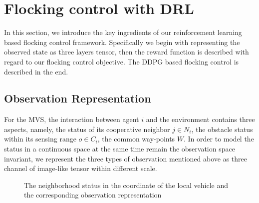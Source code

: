 \documentclass[letterpaper,10 pt,conference]{ieeeconf}
\begin{document}
\section{Flocking control with DRL}
In this section, we introduce the key ingredients of our reinforcement learning based flocking control framework. Specifically we begin with representing the observed state as three layers tensor, then the reward function is described with regard to our flocking control objective. The DDPG based flocking control is described in the end.
\subsection{Observation Representation}
For the MVS, the interaction between agent $i$ and the environment contains three aspects, namely, the status of its cooperative neighbor $j\in N_i$, the obstacle status within its sensing range $o\in C_i$, the common way-points $W$.
In order to model the status in a continuous space at the same time remain the observation space invariant, we represent the three types of observation mentioned above as three channel of image-like tensor within different scale. 
\begin{figure} 
	\centering 
	\caption{The neighborhood status in  the coordinate of the local vehicle and the corresponding observation representation} 
	
	\label{fig:subfig} %
\end{figure}
\end{document}
